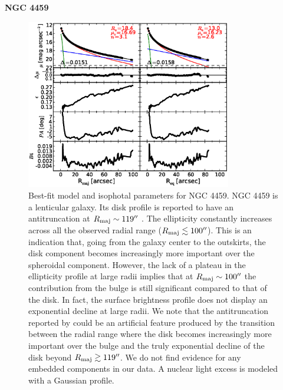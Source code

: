 \documentclass[preprint2]{emulateapj}
\newcommand{\fitfigurewidth}{0.8\textwidth}
\begin{document}
  \clearpage\newpage\noindent
  {\bf NGC 4459 \\}

  \begin{figure}[h]
  \begin{center}
  \includegraphics[width=\fitfigurewidth]{images/n4459_1Dfit.eps}
  \caption{Best-fit model and isophotal parameters for NGC 4459.
  NGC 4459 is a lenticular galaxy.
  Its disk profile is reported to have an antitruncation at $R_{\rm maj} \sim 119''$ \citep{gutierrez2011}.
  The ellipticity constantly increases across all the observed radial range ($R_{\rm maj} \lesssim 100''$).
  This is an indication that, going from the galaxy center to the outskirts,
  the disk component becomes increasingly more important over the spheroidal component.
  However, the lack of a plateau in the ellipticity profile at large radii implies that at $R_{\rm maj} \sim 100''$ 
  the contribution from the bulge is still significant compared to that of the disk.
  In fact, the surface brightness profile does not display an exponential decline at large radii.
  We note that the antitruncation reported by \cite{gutierrez2011} could be an artificial feature 
  produced by the transition between the radial range where the disk becomes increasingly more important 
  over the bulge and the truly exponential decline of the disk beyond $R_{\rm maj} \gtrsim 119''$.
  We do not find evidence for any embedded components in our data.
  A nuclear light excess is modeled with a Gaussian profile.
  }
  \end{center}
  \end{figure}
\end{document}
